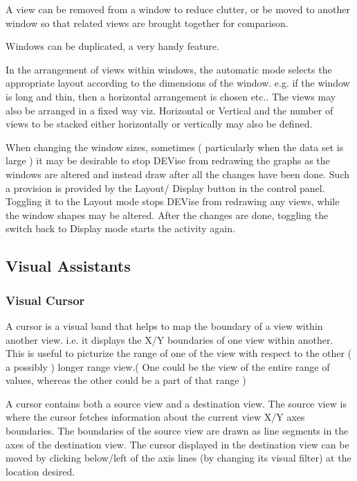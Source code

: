 A view can be removed from a window to reduce clutter, or be moved to another window so that related views are brought together for comparison. 

Windows can be duplicated, a very handy feature.

In the arrangement of views within windows, the automatic mode selects the appropriate layout according to the dimensions of the window. e.g. if the window is long and thin, then a horizontal arrangement is chosen etc.. The views may also be arranged in a fixed way viz. Horizontal or Vertical and the number of views to be stacked either horizontally or vertically may also be defined.

When changing the window sizes, sometimes ( particularly when the data set is large ) it may be desirable to stop DEVise from redrawing the graphs as the windows are altered and instead draw after all the changes have been done. Such a provision is provided by the Layout/ Display button in the control panel. Toggling it to the Layout mode stops DEVise from redrawing any views, while the window shapes may be altered. After the changes are done, toggling the switch back to Display mode starts the activity again.

\subsection{Visual Assistants}

\subsubsection{Visual Cursor}

A cursor is a visual band that helps to map the boundary of a view within another view.  i.e. it displays the X/Y boundaries of one view within another. This is useful to picturize the range of one of the  view with respect to the other ( a possibly ) longer range view.( One could be the view of the entire range of values, whereas the other could be a part of that range ) 

A cursor contains both a source view and a destination view. The source view is where the cursor fetches information about the current view X/Y axes boundaries. The boundaries of the source view are drawn as line segments in the axes of the destination view. The cursor displayed in the destination view can be moved by clicking below/left of  the axis lines  (by changing its visual filter) at the location desired.


